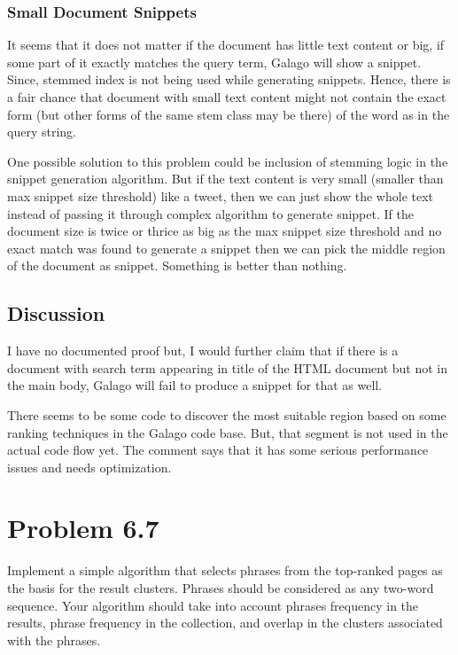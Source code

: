 \documentclass[letterpaper,12pt]{article}
\begin{document}
\subsubsection{Small Document Snippets}

It seems that it does not matter if the document has little text content or big, if some part of it exactly matches the query term, Galago will show a snippet. Since, stemmed index is not being used while generating snippets. Hence, there is a fair chance that document with small text content might not contain the exact form (but other forms of the same stem class may be there) of the word as in the query string.

One possible solution to this problem could be inclusion of stemming logic in the snippet generation algorithm. But if the text content is very small (smaller than max snippet size threshold) like a tweet, then we can just show the whole text instead of passing it through complex algorithm to generate snippet. If the document size is twice or thrice as big as the max snippet size threshold and no exact match was found to generate a snippet then we can pick the middle region of the document as snippet. Something is better than nothing.

\subsection{Discussion}

I have no documented proof but, I would further claim that if there is a document with search term appearing in title of the HTML document but not in the main body, Galago will fail to produce a snippet for that as well.

There seems to be some code to discover the most suitable region based on some ranking techniques in the Galago code base. But, that segment is not used in the actual code flow yet. The comment says that it has some serious performance issues and needs optimization.


\pagebreak


\section{Problem 6.7}

Implement a simple algorithm that selects phrases from the top-ranked pages as the basis for the result clusters. Phrases should be considered as any two-word sequence. Your algorithm should take into account phrases frequency in the results, phrase frequency in the collection, and overlap in the clusters associated with the phrases.
\end{document}
